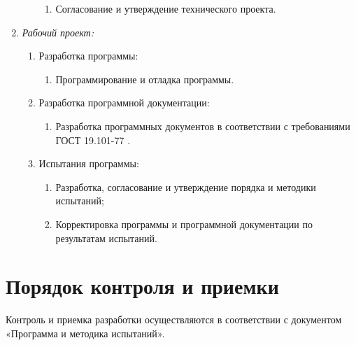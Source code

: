 \documentclass[a4paper,12pt,reqno]{article}
\begin{document}
\begin{enumerate}
\begin{enumerate}
			\begin{enumerate}
				\item Согласование и утверждение технического проекта. 
			\end{enumerate}
		\end{enumerate}
		\item \textit{Рабочий проект:}
		\begin{enumerate}
			\item Разработка программы:
			\begin{enumerate}
				\item Программирование и отладка программы. 
			\end{enumerate}
			\item Разработка программной документации:
			\begin{enumerate}
				\item Разработка программных документов в соответствии с требованиями ГОСТ 19.101-77 \cite{gost}. 
			\end{enumerate}
			\item Испытания программы:
			\begin{enumerate}
				\item Разработка, согласование и утверждение порядка и методики испытаний; 
				\item Корректировка программы и программной документации по результатам испытаний.
			\end{enumerate}
		\end{enumerate}
	\end{enumerate}
	
	\section{Порядок контроля и приемки}
	Контроль и приемка разработки осуществляются в соответствии с документом «Программа и методика испытаний».

	

						\newpage
	
	
	                    \newpage
	
	
	                    \newpage
	
	
\end{document}
